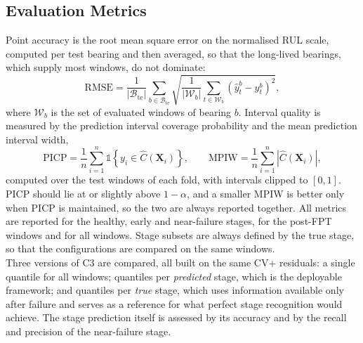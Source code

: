 \documentclass[review]{elsarticle}
\begin{document}
\subsection{Evaluation Metrics}
\label{sec:metrics}

Point accuracy is the root mean square error on the normalised RUL
scale, computed per test bearing and then averaged, so that the
long-lived bearings, which supply most windows, do not dominate:
\begin{equation}
  \mathrm{RMSE} = \frac{1}{|\mathcal{B}_{\mathrm{te}}|}
  \sum_{b \in \mathcal{B}_{\mathrm{te}}}
  \sqrt{ \frac{1}{|\mathcal{W}_b|} \sum_{t \in \mathcal{W}_b}
  \left( \hat{y}^{b}_{t} - y^{b}_{t} \right)^2 } ,
  \label{eq:rmse}
\end{equation}
where $\mathcal{W}_b$ is the set of evaluated windows of bearing $b$.
Interval quality is measured by the prediction interval coverage
probability and the mean prediction interval width,
\begin{equation}
  \mathrm{PICP} = \frac{1}{n} \sum_{i=1}^{n}
  \mathbb{1}\left\{ y_i \in \hat{C}(\mathbf{X}_i) \right\},
  \qquad
  \mathrm{MPIW} = \frac{1}{n} \sum_{i=1}^{n}
  \left| \hat{C}(\mathbf{X}_i) \right| ,
  \label{eq:picp_mpiw}
\end{equation}
computed over the test windows of each fold, with intervals clipped to
$[0,1]$. PICP should lie at or slightly above $1-\alpha$, and a smaller
MPIW is better only when PICP is maintained, so the two are always
reported together. All metrics are reported for the healthy, early and
near-failure stages, for the post-FPT windows and for all windows.
Stage subsets are always defined by the true stage, so that the
configurations are compared on the same windows.\\

Three versions of C3 are compared, all built on the same CV+
residuals: a single quantile for all windows; quantiles per
\emph{predicted} stage, which is the deployable framework; and
quantiles per \emph{true} stage, which uses information available only
after failure and serves as a reference for what perfect stage
recognition would achieve. The stage prediction itself is assessed by
its accuracy and by the recall and precision of the near-failure
stage.

\end{document}
